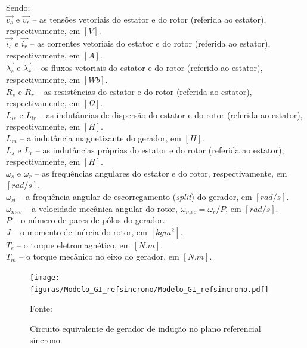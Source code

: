 Sendo:
\\ $ \vec{v_{s}} $ e $ \vec{v_{r}} $ -- as tensões vetoriais do estator e do rotor (referida ao estator), respectivamente, em $[V]$.
\\ $ \vec{i_{s}} $ e $ \vec{i_{r}} $ -- as correntes vetoriais do estator e do rotor (referida ao estator), respectivamente, em $[A]$.
\\ $ \vec{\lambda_{s}} $ e $ \vec{\lambda_{r}} $ -- os fluxos vetoriais do estator e do rotor (referido ao estator), respectivamente, em $[Wb]$.
\\ $ R_s $ e $ R_r $ -- as resistências do estator e do rotor (referida ao estator), respectivamente, em $[\Omega]$.
\\ $ L_{ls} $ e $ L_{lr} $ -- as indutâncias de dispersão do estator e do rotor (referida ao estator), respectivamente, em $[H]$.
\\ $ L_m $ -- a indutância magnetizante do gerador, em $[H]$.
\\ $ L_s $ e $ L_r $ -- as indutâncias próprias do estator e do rotor (referida ao estator), respectivamente, em $[H]$.
\\ $ \omega_{s} $ e $ \omega_{r} $ -- as frequências angulares do estator e do rotor, respectivamente, em $[rad/s]$.
\\ $ \omega_{sl} $ -- a frequência angular de escorregamento (\textit{split}) do gerador, em $[rad/s]$.
\\ $ \omega_{mec} $ -- a velocidade mecânica angular do rotor, $ \omega_{mec} = \omega_{r}/P $, em $[rad/s]$.
\\ $ P $ -- o número de pares de pólos do gerador.
\\ $ J $ -- o momento de inércia do rotor, em $[kgm^2]$.
\\ $ T_e $ -- o torque eletromagnético, em $[N.m]$.
\\ $ T_m $ -- o torque mecânico no eixo do gerador, em $[N.m]$. \\


\begin{figure}[htb]
	\begin{center}
       \caption{Circuito equivalente de gerador de indução no plano referencial síncrono.}
	    \texttt{[image: figuras/Modelo\_GI\_refsincrono/Modelo\_GI\_refsincrono.pdf]} 
	\end{center}
    \begin{center}
    {\footnotesize Fonte: }
    \end{center}
	\label{fig:modelo_GI_refsincr}
\end{figure}


